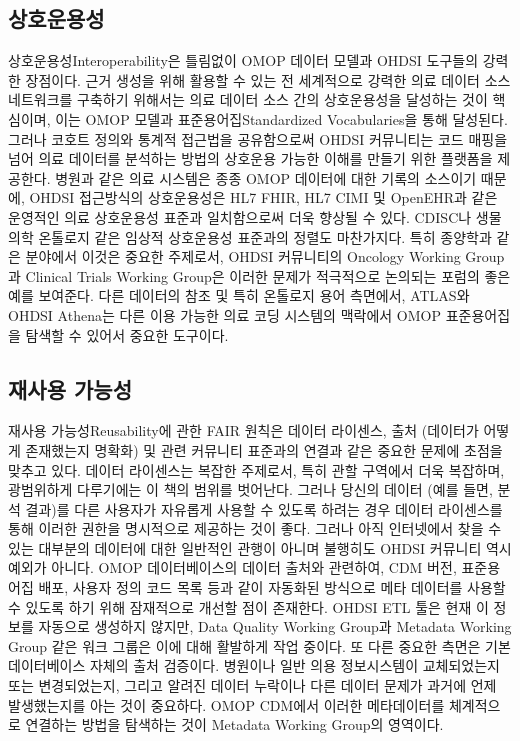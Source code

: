 \documentclass[11pt]{book}
\theoremstyle{definition}
\theoremstyle{definition}
\theoremstyle{definition}
\theoremstyle{remark}
\begin{document}
\subsection{상호운용성}

상호운용성Interoperability은 틀림없이 OMOP 데이터 모델과 OHDSI 도구들의
강력한 장점이다. 근거 생성을 위해 활용할 수 있는 전 세계적으로 강력한
의료 데이터 소스 네트워크를 구축하기 위해서는 의료 데이터 소스 간의
상호운용성을 달성하는 것이 핵심이며, 이는 OMOP 모델과
표준용어집Standardized Vocabularies을 통해 달성된다. 그러나 코호트
정의와 통계적 접근법을 공유함으로써 OHDSI 커뮤니티는 코드 매핑을 넘어
의료 데이터를 분석하는 방법의 상호운용 가능한 이해를 만들기 위한
플랫폼을 제공한다. 병원과 같은 의료 시스템은 종종 OMOP 데이터에 대한
기록의 소스이기 때문에, OHDSI 접근방식의 상호운용성은 HL7 FHIR, HL7 CIMI
및 OpenEHR과 같은 운영적인 의료 상호운용성 표준과 일치함으로써 더욱
향상될 수 있다. CDISC나 생물 의학 온톨로지 같은 임상적 상호운용성
표준과의 정렬도 마찬가지다. 특히 종양학과 같은 분야에서 이것은 중요한
주제로서, OHDSI 커뮤니티의 Oncology Working Group과 Clinical Trials
Working Group은 이러한 문제가 적극적으로 논의되는 포럼의 좋은 예를
보여준다. 다른 데이터의 참조 및 특히 온톨로지 용어 측면에서, ATLAS와
OHDSI Athena는 다른 이용 가능한 의료 코딩 시스템의 맥락에서 OMOP
표준용어집을 탐색할 수 있어서 중요한 도구이다.

\subsection{재사용 가능성}\label{-}

재사용 가능성Reusability에 관한 FAIR 원칙은 데이터 라이센스, 출처
(데이터가 어떻게 존재했는지 명확화) 및 관련 커뮤니티 표준과의 연결과
같은 중요한 문제에 초점을 맞추고 있다. 데이터 라이센스는 복잡한
주제로서, 특히 관할 구역에서 더욱 복잡하며, 광범위하게 다루기에는 이
책의 범위를 벗어난다. 그러나 당신의 데이터 (예를 들면, 분석 결과)를 다른
사용자가 자유롭게 사용할 수 있도록 하려는 경우 데이터 라이센스를 통해
이러한 권한을 명시적으로 제공하는 것이 좋다. 그러나 아직 인터넷에서 찾을
수 있는 대부분의 데이터에 대한 일반적인 관행이 아니며 불행히도 OHDSI
커뮤니티 역시 예외가 아니다. OMOP 데이터베이스의 데이터 출처와 관련하여,
CDM 버전, 표준용어집 배포, 사용자 정의 코드 목록 등과 같이 자동화된
방식으로 메타 데이터를 사용할 수 있도록 하기 위해 잠재적으로 개선할 점이
존재한다. OHDSI ETL 툴은 현재 이 정보를 자동으로 생성하지 않지만, Data
Quality Working Group과 Metadata Working Group 같은 워크 그룹은 이에
대해 활발하게 작업 중이다. 또 다른 중요한 측면은 기본 데이터베이스
자체의 출처 검증이다. 병원이나 일반 의용 정보시스템이 교체되었는지 또는
변경되었는지, 그리고 알려진 데이터 누락이나 다른 데이터 문제가 과거에
언제 발생했는지를 아는 것이 중요하다. OMOP CDM에서 이러한 메타데이터를
체계적으로 연결하는 방법을 탐색하는 것이 Metadata Working Group의
영역이다.
\end{document}
